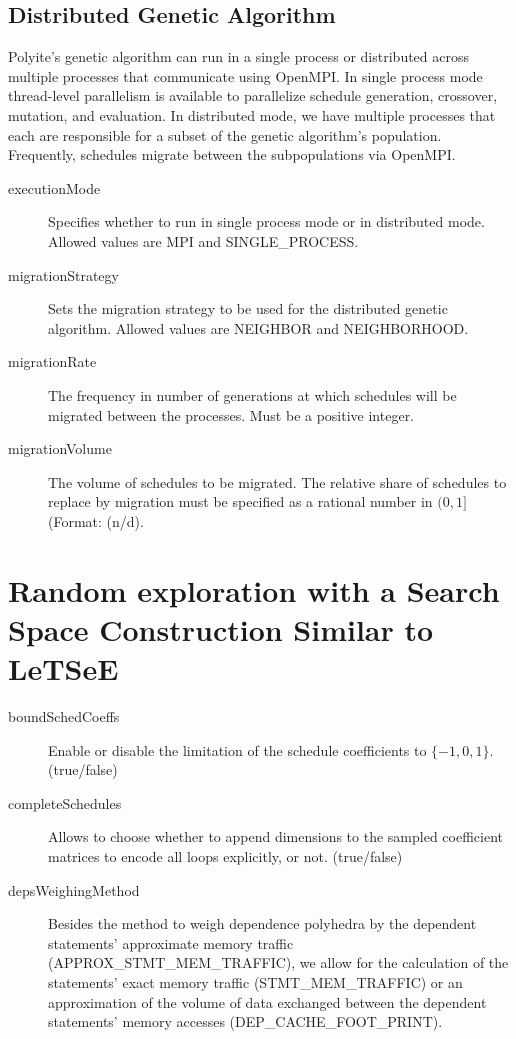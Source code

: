 \documentclass{article}
\begin{document}
\subsection{Distributed Genetic Algorithm}
Polyite's genetic algorithm can run in a single process or distributed across
multiple processes that communicate using OpenMPI. In single process mode
thread-level parallelism is available to parallelize schedule generation,
crossover, mutation, and evaluation. In distributed mode, we have multiple
processes that each are responsible for a subset of the genetic algorithm's
population. Frequently, schedules migrate between the subpopulations via
OpenMPI.
\begin{description}
  \item[executionMode] Specifies whether to run in single process mode or in
    distributed mode. Allowed values are MPI and SINGLE\_PROCESS.
  \item[migrationStrategy] Sets the migration strategy to be used for the
    distributed genetic algorithm. Allowed values are NEIGHBOR and NEIGHBORHOOD.
  \item[migrationRate] The frequency in number of generations at which
    schedules will be migrated between the processes. Must be a positive
    integer.
  \item[migrationVolume] The volume of schedules to be migrated. The relative
    share of schedules to replace by migration must be specified as a rational
    number in $(0, 1]$ (Format: (n/d).
\end{description}

\section{Random exploration with a Search Space Construction Similar to LeTSeE}
\begin{description}
  \item[boundSchedCoeffs] Enable or disable the limitation of the
    schedule coefficients to $\lbrace -1, 0, 1 \rbrace$. (true/false)
  \item[completeSchedules] Allows to choose whether to append
    dimensions to the sampled coefficient matrices to encode all loops
    explicitly, or not. (true/false)
  \item[depsWeighingMethod] Besides the method to weigh dependence polyhedra by
    the dependent statements' approximate memory traffic
    (APPROX\_STMT\_MEM\_TRAFFIC), we allow for the calculation of the
    statements' exact memory traffic (STMT\_MEM\_TRAFFIC) or an approximation
    of the volume of data exchanged between the dependent statements' memory
    accesses (DEP\_CACHE\_FOOT\_PRINT).
\end{description}
\end{document}
